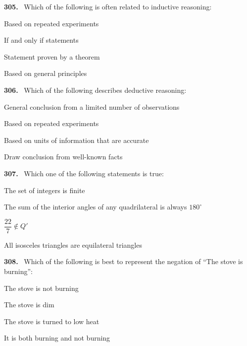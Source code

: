 \documentclass[11pt]{article}
\newenvironment{qenv}[1]{%
  \par\medskip\noindent\textbf{#1.}\ \ignorespaces
}{\par}
\begin{document}
\begin{qenv}{305} Which of the following is often related to inductive reasoning:
\begin{options} \item Based on repeated experiments \item If and only if statements \item Statement proven by a theorem \item Based on general principles \end{options} \end{qenv}

\begin{qenv}{306} Which of the following describes deductive reasoning:
\begin{options} \item General conclusion from a limited number of observations \item Based on repeated experiments \item Based on units of information that are accurate \item Draw conclusion from well-known facts \end{options} \end{qenv}

\begin{qenv}{307} Which one of the following statements is true:
\begin{options} \item The set of integers is finite \item The sum of the interior angles of any quadrilateral is always $180^{\circ}$ \item $\dfrac{22}{7} \notin Q'$ \item All isosceles triangles are equilateral triangles \end{options} \end{qenv}

\begin{qenv}{308} Which of the following is best to represent the negation of ``The stove is burning'':
\begin{options} \item The stove is not burning \item The stove is dim \item The stove is turned to low heat \item It is both burning and not burning \end{options} \end{qenv}
\end{document}
